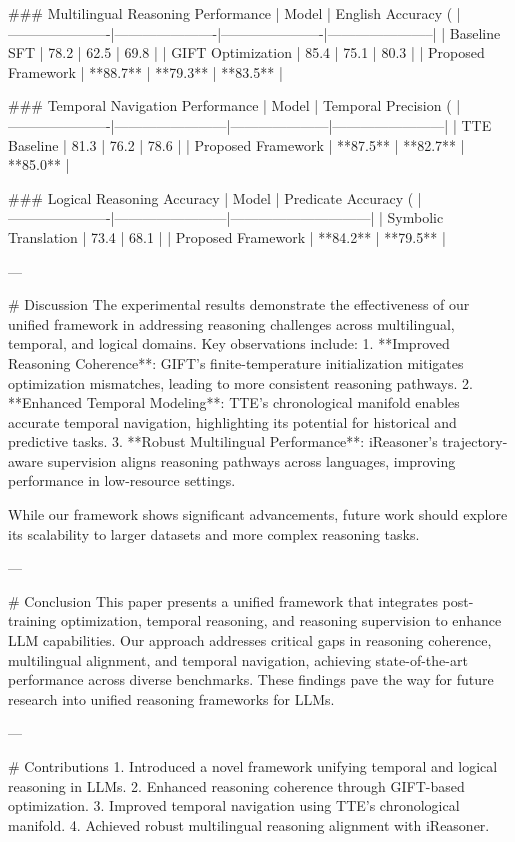 ### Multilingual Reasoning Performance  
| Model                | English Accuracy (%
|----------------------|----------------------|----------------------|-----------------------|  
| Baseline SFT         | 78.2                | 62.5                | 69.8                 |  
| GIFT Optimization    | 85.4                | 75.1                | 80.3                 |  
| Proposed Framework   | **88.7**            | **79.3**            | **83.5**             |  

### Temporal Navigation Performance  
| Model                | Temporal Precision (%
|----------------------|------------------------|---------------------|------------------------|  
| TTE Baseline         | 81.3                  | 76.2                | 78.6                  |  
| Proposed Framework   | **87.5**              | **82.7**            | **85.0**              |  

### Logical Reasoning Accuracy  
| Model                | Predicate Accuracy (%
|----------------------|------------------------|------------------------------|  
| Symbolic Translation | 73.4                  | 68.1                        |  
| Proposed Framework   | **84.2**              | **79.5**                    |  

---

# Discussion  
The experimental results demonstrate the effectiveness of our unified framework in addressing reasoning challenges across multilingual, temporal, and logical domains. Key observations include:  
1. **Improved Reasoning Coherence**: GIFT's finite-temperature initialization mitigates optimization mismatches, leading to more consistent reasoning pathways.  
2. **Enhanced Temporal Modeling**: TTE's chronological manifold enables accurate temporal navigation, highlighting its potential for historical and predictive tasks.  
3. **Robust Multilingual Performance**: iReasoner's trajectory-aware supervision aligns reasoning pathways across languages, improving performance in low-resource settings.  

While our framework shows significant advancements, future work should explore its scalability to larger datasets and more complex reasoning tasks.  

---

# Conclusion  
This paper presents a unified framework that integrates post-training optimization, temporal reasoning, and reasoning supervision to enhance LLM capabilities. Our approach addresses critical gaps in reasoning coherence, multilingual alignment, and temporal navigation, achieving state-of-the-art performance across diverse benchmarks. These findings pave the way for future research into unified reasoning frameworks for LLMs.  

---

# Contributions  
1. Introduced a novel framework unifying temporal and logical reasoning in LLMs.  
2. Enhanced reasoning coherence through GIFT-based optimization.  
3. Improved temporal navigation using TTE's chronological manifold.  
4. Achieved robust multilingual reasoning alignment with iReasoner.  

